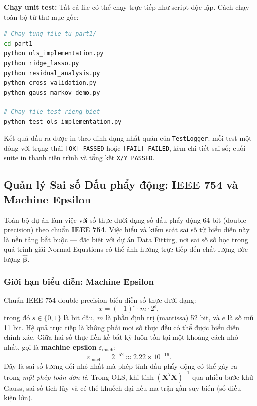 \textbf{Chạy unit test:} Tất cả file có thể chạy trực tiếp như script độc lập. Cách chạy toàn bộ từ thư mục gốc:

\begin{lstlisting}[language=bash, caption={Lệnh chạy toàn bộ unit test từ thư mục gốc}]
# Chay tung file tu part1/
cd part1
python ols_implementation.py
python ridge_lasso.py
python residual_analysis.py
python cross_validation.py
python gauss_markov_demo.py

# Chay file test rieng biet
python test_ols_implementation.py
\end{lstlisting}

Kết quả đầu ra được in theo định dạng nhất quán của \texttt{TestLogger}: mỗi test một dòng với trạng thái \textcolor{green!60!black}{\texttt{[OK] PASSED}} hoặc \textcolor{red!70!black}{\texttt{[FAIL] FAILED}}, kèm chi tiết sai số; cuối suite in thanh tiến trình và tổng kết \texttt{X/Y PASSED}.

\subsection{Quản lý Sai số Dấu phẩy động: IEEE 754 và Machine Epsilon}
\label{sec:floating_point_p2}

Toàn bộ dự án làm việc với số thực dưới dạng số dấu phẩy động 64-bit (double precision) theo chuẩn \textbf{IEEE 754}. Việc hiểu và kiểm soát sai số từ biểu diễn này là nền tảng bắt buộc --- đặc biệt với dự án Data Fitting, nơi sai số số học trong quá trình giải Normal Equations có thể ảnh hưởng trực tiếp đến chất lượng ước lượng $\hat{\boldsymbol{\beta}}$.

\subsubsection{Giới hạn biểu diễn: Machine Epsilon}

Chuẩn IEEE 754 double precision biểu diễn số thực dưới dạng:
\begin{equation}
    x = (-1)^s \cdot m \cdot 2^e,
\end{equation}
trong đó $s \in \{0,1\}$ là bit dấu, $m$ là phần định trị (mantissa) 52 bit, và $e$ là số mũ 11 bit. Hệ quả trực tiếp là không phải mọi số thực đều có thể được biểu diễn chính xác. Giữa hai số thực liền kề bất kỳ luôn tồn tại một khoảng cách nhỏ nhất, gọi là \textbf{machine epsilon} $\varepsilon_\text{mach}$:
\begin{equation}
    \varepsilon_\text{mach} = 2^{-52} \approx 2.22 \times 10^{-16}.
\end{equation}
Đây là sai số tương đối nhỏ nhất mà phép tính dấu phẩy động có thể gây ra trong \emph{một phép toán đơn lẻ}. Trong OLS, khi tính $(\mathbf{X}^T\mathbf{X})^{-1}$ qua nhiều bước khử Gauss, sai số tích lũy và có thể khuếch đại nếu ma trận gần suy biến (số điều kiện lớn).

